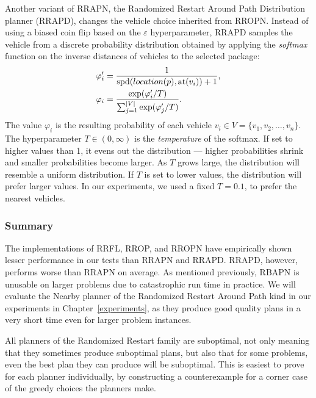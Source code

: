 Another variant of RRAPN, the
Randomized Restart Around Path Distribution planner (RRAPD),
changes the vehicle choice inherited from RROPN.
Instead of using a biased coin flip based on the $\varepsilon$
hyperparameter, RRAPD samples the vehicle
from a discrete probability distribution
obtained by applying the \textit{softmax} function on the inverse distances of vehicles to the selected package:
\begin{align*}
\varphi'_i &= \frac{1}{\textrm{spd}(location(p), \textrm{at}(v_i)) + 1},\\
\varphi_i &= \frac{\exp(\varphi'_i/T)}{\sum_{j = 1}^{|V|} \exp(\varphi'_j/T)}.
\end{align*}
The value $\varphi_i$ is the resulting probability of each vehicle $v_i \in V = \{v_1, v_2, \ldots, v_n\}$.
The hyperparameter $T \in (0, \infty)$ is the \textit{temperature}
of the softmax. If set to higher values than 1, it
evens out the distribution --- higher probabilities shrink
and smaller probabilities become larger.
As $T$ grows large, the distribution will resemble a uniform distribution.
If $T$ is set to lower values, the distribution will prefer larger values.
In our experiments, we used a fixed $T = 0.1$, to prefer the nearest vehicles.

\subsubsection{Summary}

The implementations
of RRFL, RROP, and RROPN have empirically shown
lesser performance in our tests than RRAPN and RRAPD.
RRAPD, however, performs worse than RRAPN on
average.
As mentioned previously, RBAPN is unusable on larger
problems due to catastrophic run time in practice.
We will evaluate the Nearby planner
of the Randomized Restart Around Path
kind in our experiments in Chapter~\ref{experiments},
as they produce good quality plans in a very short time
even for larger problem instances.

All planners of the Randomized Restart family
are suboptimal, not only meaning that they sometimes produce
suboptimal plans, but also that for some problems,
even the best plan they can produce will be suboptimal.
This is easiest to prove for each planner individually,
by constructing a counterexample for a corner
case of the
greedy
choices
the planners make.



























